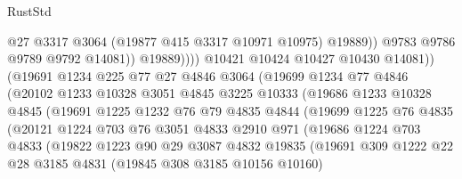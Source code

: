 \begin{lexlean}{RustStd}
\begin{coremodule}
                                    @27
                                    @3317
                                    @3064
                                    (@19877 @415 @3317 @10971 @10975)
                                    @19889))
                                @9783
                                @9786
                                @9789
                                @9792
                                @14081))
                            @19889))))
                    @10421
                    @10424
                    @10427
                    @10430
                    @14081))
                (@19691
                  @1234
                  @225
                  @77
                  @27
                  @4846
                  @3064
                  (@19699
                    @1234
                    @77
                    @4846
                    (@20102
                      @1233
                      @10328
                      @3051
                      @4845
                      @3225
                      @10333
                      (@19686
                        @1233
                        @10328
                        @4845
                        (@19691
                          @1225
                          @1232
                          @76
                          @79
                          @4835
                          @4844
                          (@19699
                            @1225
                            @76
                            @4835
                            (@20121
                              @1224
                              @703
                              @76
                              @3051
                              @4833
                              @2910
                              @971
                              (@19686
                                @1224
                                @703
                                @4833
                                (@19822
                                  @1223
                                  @90
                                  @29
                                  @3087
                                  @4832
                                  @19835
                                  (@19691
                                    @309
                                    @1222
                                    @22
                                    @28
                                    @3185
                                    @4831
                                    (@19845 @308 @3185 @10156 @10160)

\end{coremodule}
\end{lexlean}
